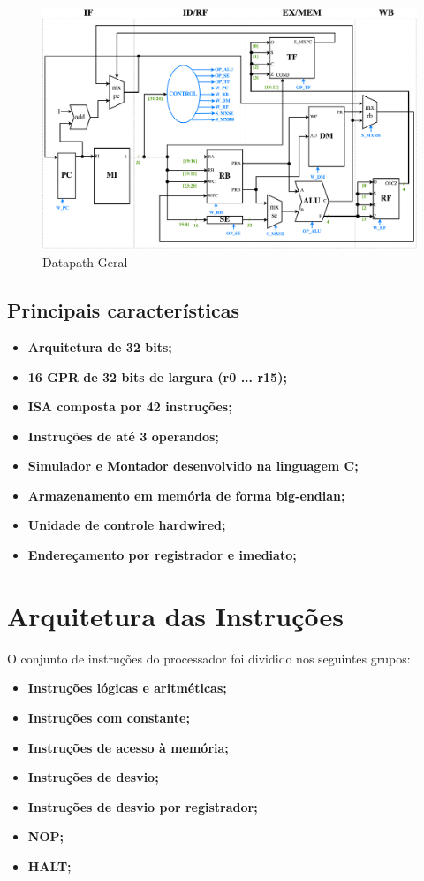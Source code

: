 \documentclass{report}
\begin{document}
\begin{figure}[H]
\centering
\includegraphics[width=\textwidth]{./pictures/Datapath.pdf}
\caption{Datapath Geral}
\end{figure}

\subsection{Principais características}
\begin{itemize}
    \item \textbf {Arquitetura de 32 bits;}
    \item \textbf {16 GPR de 32 bits de largura (r0 ... r15);}
    \item \textbf {ISA composta por 42 instruções;}
    \item \textbf {Instruções de até 3 operandos;}
    \item \textbf {Simulador e Montador desenvolvido na linguagem C;}
    \item \textbf {Armazenamento em memória de forma big-endian;}
    \item \textbf {Unidade de controle hardwired;}
    \item \textbf {Endereçamento por registrador e imediato;}
\end{itemize}

\newpage
\section{Arquitetura das Instruções}
O conjunto de instruções do processador foi dividido nos seguintes grupos:\newline
\begin{itemize}
    \item \textbf {Instruções lógicas e aritméticas;}
    \item \textbf {Instruções com constante;}
    \item \textbf {Instruções de acesso à memória;}
    \item \textbf {Instruções de desvio;}
    \item \textbf {Instruções de desvio por registrador;}
    \item \textbf {NOP;}
    \item \textbf {HALT;}
\end{itemize}
\end{document}
